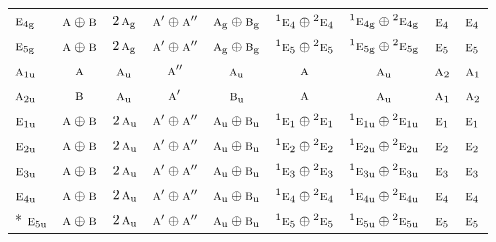 \documentclass[10pt,a4paper]{article}
\numberwithin{equation}{section}
\newcommand{\irr}[1]{\text{\normalfont\scshape #1}}
\newcommand{\conjpair}[1]{{}^{#1}}
\newcommand{\ptag}[1]{\mathrm{#1}}
\begin{document}
{\begin{longtable}{@{}lcccccccc@{}}
$\irr{e}_{4\ptag{g}}$ & $\irr{a}\oplus \irr{b}$ & $2\,\irr{a}_{\ptag{g}}$ & $\irr{a}'\oplus \irr{a}''$ & $\irr{a}_{\ptag{g}}\oplus \irr{b}_{\ptag{g}}$ & $\conjpair{1}\irr{e}_{4}\oplus \conjpair{2}\irr{e}_{4}$ & $\conjpair{1}\irr{e}_{4\ptag{g}}\oplus \conjpair{2}\irr{e}_{4\ptag{g}}$ & $\irr{e}_{4}$ & $\irr{e}_{4}$\\
$\irr{e}_{5\ptag{g}}$ & $\irr{a}\oplus \irr{b}$ & $2\,\irr{a}_{\ptag{g}}$ & $\irr{a}'\oplus \irr{a}''$ & $\irr{a}_{\ptag{g}}\oplus \irr{b}_{\ptag{g}}$ & $\conjpair{1}\irr{e}_{5}\oplus \conjpair{2}\irr{e}_{5}$ & $\conjpair{1}\irr{e}_{5\ptag{g}}\oplus \conjpair{2}\irr{e}_{5\ptag{g}}$ & $\irr{e}_{5}$ & $\irr{e}_{5}$\\
$\irr{a}_{1\ptag{u}}$ & $\irr{a}$ & $\irr{a}_{\ptag{u}}$ & $\irr{a}''$ & $\irr{a}_{\ptag{u}}$ & $\irr{a}$ & $\irr{a}_{\ptag{u}}$ & $\irr{a}_{2}$ & $\irr{a}_{1}$\\
$\irr{a}_{2\ptag{u}}$ & $\irr{b}$ & $\irr{a}_{\ptag{u}}$ & $\irr{a}'$ & $\irr{b}_{\ptag{u}}$ & $\irr{a}$ & $\irr{a}_{\ptag{u}}$ & $\irr{a}_{1}$ & $\irr{a}_{2}$\\
$\irr{e}_{1\ptag{u}}$ & $\irr{a}\oplus \irr{b}$ & $2\,\irr{a}_{\ptag{u}}$ & $\irr{a}'\oplus \irr{a}''$ & $\irr{a}_{\ptag{u}}\oplus \irr{b}_{\ptag{u}}$ & $\conjpair{1}\irr{e}_{1}\oplus \conjpair{2}\irr{e}_{1}$ & $\conjpair{1}\irr{e}_{1\ptag{u}}\oplus \conjpair{2}\irr{e}_{1\ptag{u}}$ & $\irr{e}_{1}$ & $\irr{e}_{1}$\\
$\irr{e}_{2\ptag{u}}$ & $\irr{a}\oplus \irr{b}$ & $2\,\irr{a}_{\ptag{u}}$ & $\irr{a}'\oplus \irr{a}''$ & $\irr{a}_{\ptag{u}}\oplus \irr{b}_{\ptag{u}}$ & $\conjpair{1}\irr{e}_{2}\oplus \conjpair{2}\irr{e}_{2}$ & $\conjpair{1}\irr{e}_{2\ptag{u}}\oplus \conjpair{2}\irr{e}_{2\ptag{u}}$ & $\irr{e}_{2}$ & $\irr{e}_{2}$\\
$\irr{e}_{3\ptag{u}}$ & $\irr{a}\oplus \irr{b}$ & $2\,\irr{a}_{\ptag{u}}$ & $\irr{a}'\oplus \irr{a}''$ & $\irr{a}_{\ptag{u}}\oplus \irr{b}_{\ptag{u}}$ & $\conjpair{1}\irr{e}_{3}\oplus \conjpair{2}\irr{e}_{3}$ & $\conjpair{1}\irr{e}_{3\ptag{u}}\oplus \conjpair{2}\irr{e}_{3\ptag{u}}$ & $\irr{e}_{3}$ & $\irr{e}_{3}$\\
$\irr{e}_{4\ptag{u}}$ & $\irr{a}\oplus \irr{b}$ & $2\,\irr{a}_{\ptag{u}}$ & $\irr{a}'\oplus \irr{a}''$ & $\irr{a}_{\ptag{u}}\oplus \irr{b}_{\ptag{u}}$ & $\conjpair{1}\irr{e}_{4}\oplus \conjpair{2}\irr{e}_{4}$ & $\conjpair{1}\irr{e}_{4\ptag{u}}\oplus \conjpair{2}\irr{e}_{4\ptag{u}}$ & $\irr{e}_{4}$ & $\irr{e}_{4}$\\*
$\irr{e}_{5\ptag{u}}$ & $\irr{a}\oplus \irr{b}$ & $2\,\irr{a}_{\ptag{u}}$ & $\irr{a}'\oplus \irr{a}''$ & $\irr{a}_{\ptag{u}}\oplus \irr{b}_{\ptag{u}}$ & $\conjpair{1}\irr{e}_{5}\oplus \conjpair{2}\irr{e}_{5}$ & $\conjpair{1}\irr{e}_{5\ptag{u}}\oplus \conjpair{2}\irr{e}_{5\ptag{u}}$ & $\irr{e}_{5}$ & $\irr{e}_{5}$\\
\bottomrule\end{longtable}}
\end{document}
